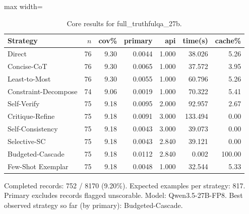 \documentclass[10pt,twocolumn]{article}
\begin{document}
\begin{table}[t]
\centering
\caption{Core results for full\_truthfulqa\_27b.}
\label{tab:full_truthfulqa_27b_core}
\begin{adjustbox}{max width=\textwidth}
\begin{tabular}{lrrrrrr}
\toprule
Strategy & $n$ & cov\% & primary & api & time(s) & cache\% \\
\midrule
Direct & 76 & 9.30 & 0.0044 & 1.000 & 38.026 & 5.26 \\
Concise-CoT & 76 & 9.30 & 0.0065 & 1.000 & 37.572 & 3.95 \\
Least-to-Most & 76 & 9.30 & 0.0055 & 1.000 & 60.796 & 5.26 \\
Constraint-Decompose & 74 & 9.06 & 0.0019 & 1.000 & 70.322 & 5.41 \\
Self-Verify & 75 & 9.18 & 0.0095 & 2.000 & 92.957 & 2.67 \\
Critique-Refine & 75 & 9.18 & 0.0091 & 3.000 & 133.494 & 0.00 \\
Self-Consistency & 75 & 9.18 & 0.0043 & 3.000 & 39.073 & 0.00 \\
Selective-SC & 75 & 9.18 & 0.0043 & 2.840 & 39.121 & 0.00 \\
Budgeted-Cascade & 75 & 9.18 & 0.0112 & 2.840 & 0.002 & 100.00 \\
Few-Shot Exemplar & 75 & 9.18 & 0.0048 & 1.000 & 32.544 & 5.33 \\
\bottomrule
\end{tabular}
\end{adjustbox}
\vspace{2pt}\parbox{0.98\textwidth}{\footnotesize Completed records: 752 / 8170 (9.20\%). Expected examples per strategy: 817. Primary excludes records flagged unscorable. Model: Qwen3.5-27B-FP8. Best observed strategy so far (by primary): Budgeted-Cascade.}
\end{table}
\end{document}
